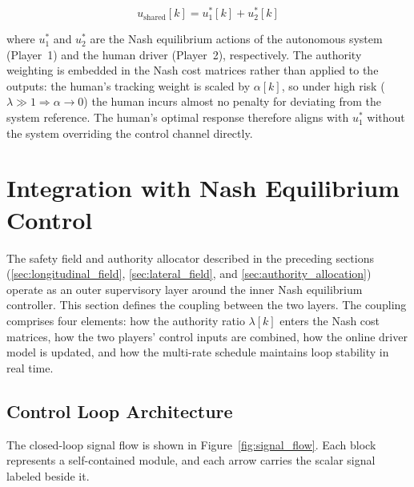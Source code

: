 \documentclass[12pt,a4paper,oneside]{report}
\begin{document}
\begin{equation}
u_{\mathrm{shared}}[k] = u_1^{*}[k] + u_2^{*}[k]
\label{eq:shared_control}
\end{equation}

where $u_1^{*}$ and $u_2^{*}$ are the Nash equilibrium actions of the autonomous system (Player~1) and the human driver (Player~2), respectively. The authority weighting is embedded in the Nash cost matrices rather than applied to the outputs: the human's tracking weight is scaled by $\alpha[k]$, so under high risk ($\lambda \gg 1 \Rightarrow \alpha \to 0$) the human incurs almost no penalty for deviating from the system reference. The human's optimal response therefore aligns with $u_1^{*}$ without the system overriding the control channel directly.

\section{Integration with Nash Equilibrium Control}
\label{sec:nash_integration}

The safety field and authority allocator described in the preceding sections (\ref{sec:longitudinal_field}, \ref{sec:lateral_field}, and \ref{sec:authority_allocation}) operate as an outer supervisory layer around the inner Nash equilibrium controller. This section defines the coupling between the two layers. The coupling comprises four elements: how the authority ratio $\lambda[k]$ enters the Nash cost matrices, how the two players' control inputs are combined, how the online driver model is updated, and how the multi-rate schedule maintains loop stability in real time.

\subsection{Control Loop Architecture}
\label{sec:nash_loop}

The closed-loop signal flow is shown in Figure~\ref{fig:signal_flow}. Each block represents a self-contained module, and each arrow carries the scalar signal labeled beside it.
\end{document}
